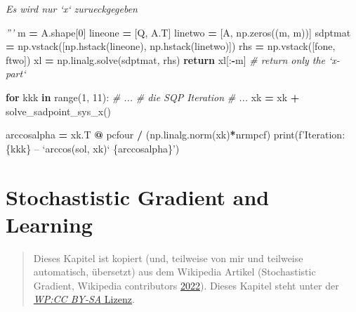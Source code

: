 \documentclass[]{book}
\newenvironment{Shaded}{\begin{snugshade}}{\end{snugshade}}
\newcommand{\BuiltInTok}[1]{#1}
\newcommand{\CommentTok}[1]{\textcolor[rgb]{0.56,0.35,0.01}{\textit{#1}}}
\newcommand{\ControlFlowTok}[1]{\textcolor[rgb]{0.13,0.29,0.53}{\textbf{#1}}}
\newcommand{\DecValTok}[1]{\textcolor[rgb]{0.00,0.00,0.81}{#1}}
\newcommand{\KeywordTok}[1]{\textcolor[rgb]{0.13,0.29,0.53}{\textbf{#1}}}
\newcommand{\NormalTok}[1]{#1}
\newcommand{\OperatorTok}[1]{\textcolor[rgb]{0.81,0.36,0.00}{\textbf{#1}}}
\newcommand{\SpecialCharTok}[1]{\textcolor[rgb]{0.00,0.00,0.00}{#1}}
\newcommand{\SpecialStringTok}[1]{\textcolor[rgb]{0.31,0.60,0.02}{#1}}
\newenvironment {JHSAYS} [0] {\begin{quote}\color{jhsc}} {\end{quote}}
\theoremstyle{definition}
\theoremstyle{definition}
\theoremstyle{definition}
\theoremstyle{definition}
\theoremstyle{remark}
\begin{document}
\begin{Shaded}
\begin{Highlighting}[]
\CommentTok{    Es wird nur `x` zurueckgegeben}

\CommentTok{    '''}
\NormalTok{    m }\OperatorTok{=}\NormalTok{ A.shape[}\DecValTok{0}\NormalTok{]}
\NormalTok{    lineone }\OperatorTok{=}\NormalTok{ [Q, A.T]}
\NormalTok{    linetwo }\OperatorTok{=}\NormalTok{ [A, np.zeros((m, m))]}
\NormalTok{    sdptmat }\OperatorTok{=}\NormalTok{ np.vstack([np.hstack(lineone),}
\NormalTok{                         np.hstack(linetwo)])}
\NormalTok{    rhs }\OperatorTok{=}\NormalTok{ np.vstack([fone, ftwo])}
\NormalTok{    xl }\OperatorTok{=}\NormalTok{ np.linalg.solve(sdptmat, rhs)}
    \ControlFlowTok{return}\NormalTok{ xl[:}\OperatorTok{-}\NormalTok{m]  }\CommentTok{# return only the `x-part`}


\ControlFlowTok{for}\NormalTok{ kkk }\KeywordTok{in} \BuiltInTok{range}\NormalTok{(}\DecValTok{1}\NormalTok{, }\DecValTok{11}\NormalTok{):}
    \CommentTok{# ...}
    \CommentTok{# die SQP Iteration}
    \CommentTok{# ...}
\NormalTok{    xk }\OperatorTok{=}\NormalTok{ xk }\OperatorTok{+}\NormalTok{ solve_sadpoint_sys_x()}

\NormalTok{    arccosalpha }\OperatorTok{=}\NormalTok{ xk.T }\OperatorTok{@}\NormalTok{ pcfour }\OperatorTok{/}\NormalTok{ (np.linalg.norm(xk)}\OperatorTok{*}\NormalTok{nrmpcf)}
    \BuiltInTok{print}\NormalTok{(}\SpecialStringTok{f'Iteration: }\SpecialCharTok{\{}\NormalTok{kkk}\SpecialCharTok{\}}\SpecialStringTok{ -- `arccos(sol, xk)` }\SpecialCharTok{\{}\NormalTok{arccosalpha}\SpecialCharTok{\}}\SpecialStringTok{'}\NormalTok{)}
\end{Highlighting}
\end{Shaded}

\hypertarget{stochastistic-gradient-and-learning}{%
\chapter{Stochastistic Gradient and Learning}\label{stochastistic-gradient-and-learning}}

\leavevmode\hypertarget{sdg-just-wiki}{}%
\begin{JHSAYS}
Dieses Kapitel ist kopiert (und, teilweise von mir und teilweise automatisch, übersetzt) aus dem Wikipedia Artikel (Stochastistic Gradient, Wikipedia contributors \protect\hyperlink{ref-enwiki:1098148439}{2022}). Dieses Kapitel steht unter der \href{https://en.wikipedia.org/wiki/Wikipedia:Text_of_Creative_Commons_Attribution-ShareAlike_3.0_Unported_License}{\emph{WP:CC BY-SA} Lizenz}.

\end{JHSAYS}
\end{document}
